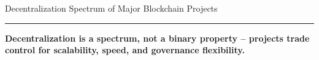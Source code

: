 \documentclass[8pt,aspectratio=169]{beamer}
\newcommand{\bottomnote}[1]{%
\vfill
\vspace{-2mm}
\textcolor{mllavender2}{\rule{\textwidth}{0.4pt}}
\vspace{1mm}
\footnotesize
\textbf{#1}
}
\begin{document}
\begin{frame}{Decentralization Spectrum of Major Blockchain Projects}
\begin{center}
\end{center}
\bottomnote{Decentralization is a spectrum, not a binary property -- projects trade control for scalability, speed, and governance flexibility.}
\end{frame}

\end{document}
